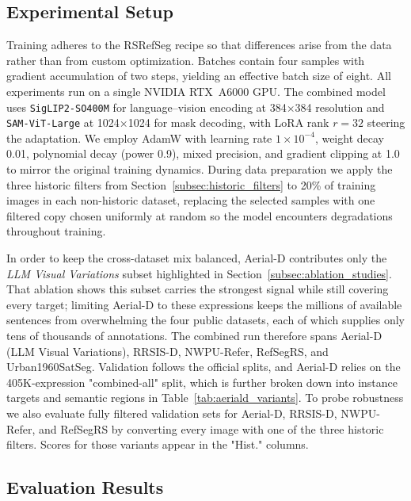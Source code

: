 \subsection{Experimental Setup}
\label{subsec:experimental_setup}

Training adheres to the RSRefSeg recipe so that differences arise from the data rather than from custom optimization. Batches contain four samples with gradient accumulation of two steps, yielding an effective batch size of eight. All experiments run on a single NVIDIA RTX~A6000 GPU. The combined model uses \texttt{SigLIP2-SO400M} for language–vision encoding at 384×384 resolution and \texttt{SAM-ViT-Large} at 1024×1024 for mask decoding, with LoRA rank \(r=32\) steering the adaptation. We employ AdamW\cite{adamw} with learning rate $1\times10^{-4}$, weight decay 0.01, polynomial decay (power 0.9), mixed precision, and gradient clipping at 1.0 to mirror the original training dynamics. During data preparation we apply the three historic filters from Section~\ref{subsec:historic_filters} to 20\% of training images in each non-historic dataset, replacing the selected samples with one filtered copy chosen uniformly at random so the model encounters degradations throughout training.

In order to keep the cross-dataset mix balanced, Aerial-D contributes only the \emph{LLM Visual Variations} subset highlighted in Section~\ref{subsec:ablation_studies}. That ablation shows this subset carries the strongest signal while still covering every target; limiting Aerial-D to these expressions keeps the millions of available sentences from overwhelming the four public datasets, each of which supplies only tens of thousands of annotations. The combined run therefore spans Aerial-D (LLM Visual Variations), RRSIS-D\cite{liu2024rotated}, NWPU-Refer\cite{yang2024large}, RefSegRS\cite{yuan2023rrsis}, and Urban1960SatSeg\cite{hao2025urban1960satseg}. Validation follows the official splits, and Aerial-D relies on the 405K-expression "combined-all" split, which is further broken down into instance targets and semantic regions in Table~\ref{tab:aeriald_variants}. To probe robustness we also evaluate fully filtered validation sets for Aerial-D, RRSIS-D, NWPU-Refer, and RefSegRS by converting every image with one of the three historic filters. Scores for those variants appear in the "Hist." columns.

\subsection{Evaluation Results}
\label{subsec:evaluation_results}

